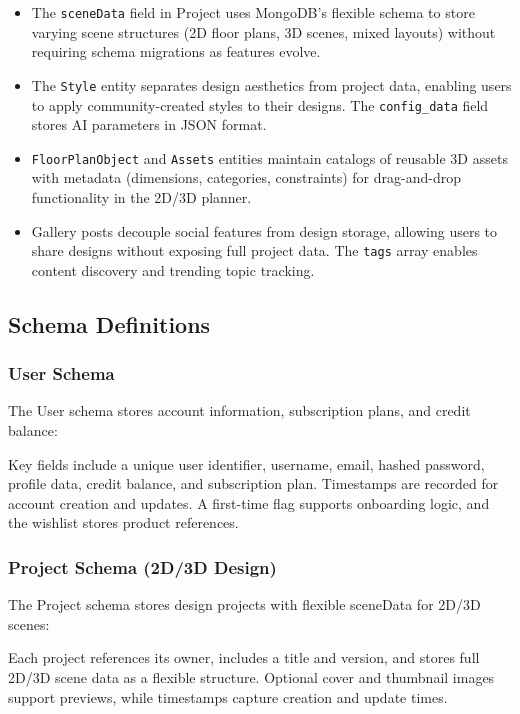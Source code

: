 \begin{itemize}
    \item The \texttt{sceneData} field in Project uses MongoDB's flexible schema to store varying scene structures (2D floor plans, 3D scenes, mixed layouts) without requiring schema migrations as features evolve.
    
    \item The \texttt{Style} entity separates design aesthetics from project data, enabling users to apply community-created styles to their designs. The \texttt{config\_data} field stores AI parameters in JSON format.
    
    \item \texttt{FloorPlanObject} and \texttt{Assets} entities maintain catalogs of reusable 3D assets with metadata (dimensions, categories, constraints) for drag-and-drop functionality in the 2D/3D planner.
    
    \item Gallery posts decouple social features from design storage, allowing users to share designs without exposing full project data. The \texttt{tags} array enables content discovery and trending topic tracking.
\end{itemize}

\subsection{Schema Definitions}

\subsubsection{User Schema}

The User schema stores account information, subscription plans, and credit balance:

Key fields include a unique user identifier, username, email, hashed password, profile data, credit balance, and subscription plan. Timestamps are recorded for account creation and updates. A first-time flag supports onboarding logic, and the wishlist stores product references.

\subsubsection{Project Schema (2D/3D Design)}

The Project schema stores design projects with flexible sceneData for 2D/3D scenes:

Each project references its owner, includes a title and version, and stores full 2D/3D scene data as a flexible structure. Optional cover and thumbnail images support previews, while timestamps capture creation and update times.


